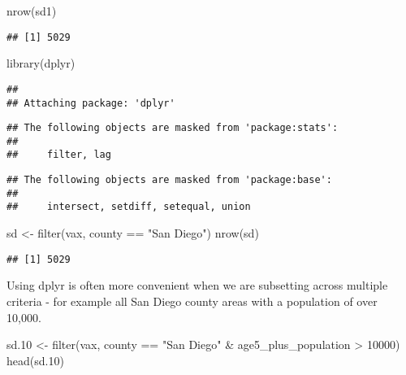 \documentclass[
]{article}
\newenvironment{Shaded}{\begin{snugshade}}{\end{snugshade}}
\newcommand{\DecValTok}[1]{\textcolor[rgb]{0.00,0.00,0.81}{#1}}
\newcommand{\FloatTok}[1]{\textcolor[rgb]{0.00,0.00,0.81}{#1}}
\newcommand{\FunctionTok}[1]{\textcolor[rgb]{0.00,0.00,0.00}{#1}}
\newcommand{\NormalTok}[1]{#1}
\newcommand{\OtherTok}[1]{\textcolor[rgb]{0.56,0.35,0.01}{#1}}
\newcommand{\SpecialCharTok}[1]{\textcolor[rgb]{0.00,0.00,0.00}{#1}}
\newcommand{\StringTok}[1]{\textcolor[rgb]{0.31,0.60,0.02}{#1}}
\begin{document}
\begin{Shaded}
\begin{Highlighting}[]
\FunctionTok{nrow}\NormalTok{(sd1)}
\end{Highlighting}
\end{Shaded}

\begin{verbatim}
## [1] 5029
\end{verbatim}

\begin{Shaded}
\begin{Highlighting}[]
\FunctionTok{library}\NormalTok{(dplyr)}
\end{Highlighting}
\end{Shaded}

\begin{verbatim}
## 
## Attaching package: 'dplyr'
\end{verbatim}

\begin{verbatim}
## The following objects are masked from 'package:stats':
## 
##     filter, lag
\end{verbatim}

\begin{verbatim}
## The following objects are masked from 'package:base':
## 
##     intersect, setdiff, setequal, union
\end{verbatim}

\begin{Shaded}
\begin{Highlighting}[]
\NormalTok{sd }\OtherTok{\textless{}{-}} \FunctionTok{filter}\NormalTok{(vax, county }\SpecialCharTok{==} \StringTok{"San Diego"}\NormalTok{)}
\FunctionTok{nrow}\NormalTok{(sd)}
\end{Highlighting}
\end{Shaded}

\begin{verbatim}
## [1] 5029
\end{verbatim}

Using dplyr is often more convenient when we are subsetting across
multiple criteria - for example all San Diego county areas with a
population of over 10,000.

\begin{Shaded}
\begin{Highlighting}[]
\NormalTok{sd}\FloatTok{.10} \OtherTok{\textless{}{-}} \FunctionTok{filter}\NormalTok{(vax, county }\SpecialCharTok{==} \StringTok{"San Diego"} \SpecialCharTok{\&}
\NormalTok{                age5\_plus\_population }\SpecialCharTok{\textgreater{}} \DecValTok{10000}\NormalTok{)}
\FunctionTok{head}\NormalTok{(sd}\FloatTok{.10}\NormalTok{)}
\end{Highlighting}
\end{Shaded}
\end{document}
